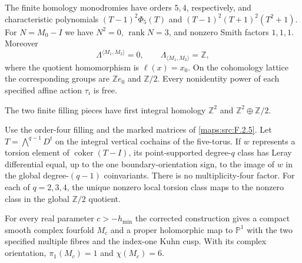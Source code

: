 \begin{theorem}\label{night:P1.1}
The finite homology monodromies have orders $5,4$, respectively, and
characteristic polynomials
$(T-1)^2\Phi _5(T)$ and $(T-1)^2(T+1)^2(T^2+1)$.
For $N=M_0-I$ we have $N^2=0$, $\operatorname{rank}N=3$, and
nonzero Smith factors $1,1,1$.  Moreover
\[
 \Lambda^{\langle M_1,M_2\rangle}=0,\qquad
 \Lambda_{\langle M_1,M_2\rangle}=\mathbb Z,
\]
where the quotient homomorphism is $\ell(x)=x_0$.
On the cohomology lattice the corresponding groups are $\mathbb Ze_0$
and $\mathbb Z/2$.  Every nonidentity power of each specified affine
action $\tau_i$ is free.
\end{theorem}

\begin{theorem}\label{night:P1.3}
The two finite filling pieces have first integral homology
$\mathbb Z^2$ and $\mathbb Z^2\oplus\mathbb Z/2$.
\end{theorem}

\begin{lemma}
\label{mapsaudit:order-four-torsion-transgression}

Use the order-four filling and the marked matrices of \cref{maps:src:F.2.5}.
Let $T=\bigwedge^{q-1}D^t$ on the integral vertical cochains of the
five-torus. If $w$ represents a torsion element of
$\operatorname{coker}(T-I)$, its point-supported degree-$q$ class has
Leray differential equal, up to the one boundary-orientation sign, to
the image of $w$ in the global degree-$(q-1)$ coinvariants. There is
no multiplicity-four factor. For each of $q=2,3,4$, the unique nonzero local torsion class maps
to the nonzero class in the global $\mathbb Z/2$ quotient.
\end{lemma}

\begin{theorem}\label{night:P1.10}
For every real parameter $c>-h_{\min}$ the corrected construction gives
a compact smooth complex fourfold $M_c$ and a proper holomorphic map
to $\mathbb P^1$ with the two specified multiple fibres and the
index-one Kuhn cusp.  With its complex orientation,
$\pi_1(M_c)=1$ and $\chi(M_c)=6$.
\end{theorem}

